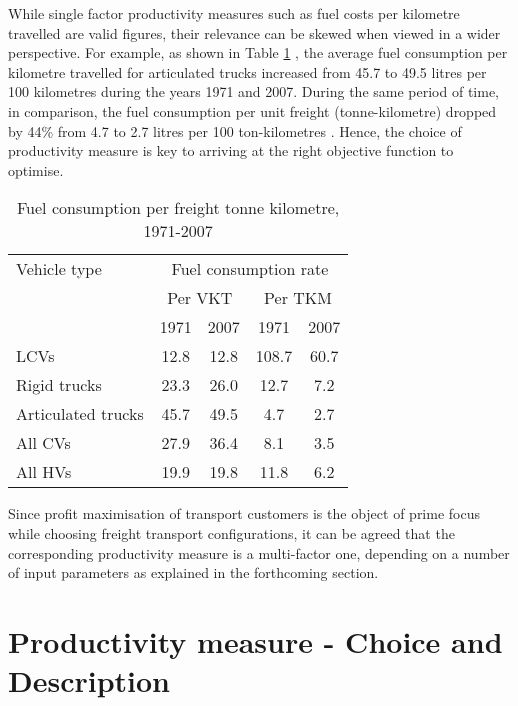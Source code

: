 \documentclass[ExampleMasters.tex]{subfiles}
\begin{document}
		While single factor productivity measures such as fuel costs per kilometre travelled are valid figures, their relevance can be skewed when viewed in a wider perspective. For example, as shown in Table \ref{table:fuelConsumptionRate} \cite[T.~2.8]{TruckProdAus}, the average fuel consumption per kilometre travelled for articulated trucks increased from 45.7 to 49.5 litres per 100 kilometres during the years 1971 and 2007. During the same period of time, in comparison, the fuel consumption per unit freight (tonne-kilometre) dropped by 44\% from 4.7 to 2.7 litres per 100 ton-kilometres \cite{TruckProdAus}. Hence, the choice of productivity measure is key to arriving at the right objective function to optimise.\\

		\begin{table}[ht]
			\centering 
			\begin{tabular}{l c c c c}
  			\hline
			Vehicle type & \multicolumn{4}{c}{Fuel consumption rate}\\ \cline{2-3} \cline{4-5}
			\ & \multicolumn{2}{c}{Per VKT} & \multicolumn{2}{c}{Per TKM}\\ \cline{2-3} \cline{4-5}
			\ & 1971 & 2007 & 1971 & 2007\\ \hline
			    LCVs  & 12.8 & 12.8 & 108.7 & 60.7\\
			    Rigid trucks  & 23.3 & 26.0 & 12.7  & 7.2\\
			    Articulated trucks  & 45.7 & 49.5 & 4.7 & 2.7  \\
			    All CVs  & 27.9 & 36.4 & 8.1 & 3.5 \\
			    All HVs  & 19.9 & 19.8 & 11.8 & 6.2 \\
			\hline 
			\end{tabular}
			\caption{Fuel consumption per freight tonne kilometre, 1971-2007 \cite{TruckProdAus}} 
			\label{table:fuelConsumptionRate} 
		\end{table}

		Since profit maximisation of transport customers is the object of prime focus while choosing freight transport configurations, it can be agreed that the corresponding productivity measure is a multi-factor one, depending on a number of input parameters as explained in the forthcoming section.\\

	\section{Productivity measure - Choice and Description}
\end{document}
